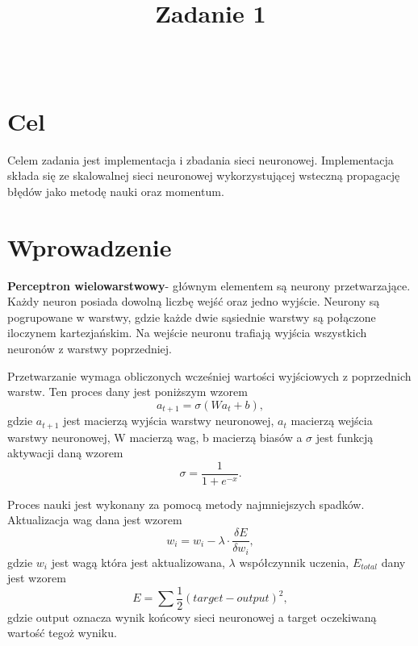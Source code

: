 \documentclass{classrep}
\author{%
\studentinfo[210320@edu.p.lodz.pl]{Michał Sobczyk}{210320}\\
  \studentinfo[215145@edu.p.lodz.pl]{Michał Chudzik}{215145}
}
\title{Zadanie 1}
\begin{document}
\maketitle
\thispagestyle{fancyplain}

\section{Cel}
	Celem zadania jest implementacja i zbadania sieci neuronowej. Implementacja składa się ze skalowalnej sieci neuronowej wykorzystującej wsteczną propagację błędów jako metodę nauki oraz momentum.

\section{Wprowadzenie}
	\textbf{Perceptron wielowarstwowy}-  głównym elementem są neurony przetwarzające. Każdy neuron posiada dowolną liczbę wejść oraz jedno wyjście. Neurony są pogrupowane w warstwy, gdzie każde dwie sąsiednie warstwy są połączone iloczynem kartezjańskim. Na wejście neuronu trafiają wyjścia wszystkich neuronów z warstwy poprzedniej.


Przetwarzanie wymaga obliczonych wcześniej wartości wyjściowych z poprzednich warstw. Ten proces dany jest poniższym wzorem
\begin{equation} \label{eq:feedforward}
	a_{t+1} = \sigma ( Wa_t + b),
\end{equation}
gdzie $a_{t+1}$ jest macierzą wyjścia warstwy neuronowej, $a_t$ macierzą wejścia warstwy neuronowej, W macierzą wag, b macierzą biasów a $\sigma$ jest funkcją aktywacji daną wzorem
\begin{equation} \label{eq:activation}
	\sigma = \frac{1}{1 + e^{-x}}.
\end{equation}


Proces nauki jest wykonany za pomocą metody najmniejszych spadków. Aktualizacja wag dana jest wzorem
\begin{equation} \label{eq:generalBackPropagationWeight}
	w_i = w_i - \lambda \cdot \frac{\delta E}{\delta w_i},
\end{equation}
gdzie $w_i$ jest wagą która jest aktualizowana, $\lambda$ współczynnik uczenia, $E_{total}$ dany jest wzorem
\begin{equation} \label{eq:totalError}
	E = \sum \frac{1}{2}(target - output)^2,
\end{equation}
gdzie output oznacza wynik końcowy sieci neuronowej a target oczekiwaną wartość tegoż wyniku.
\end{document}
